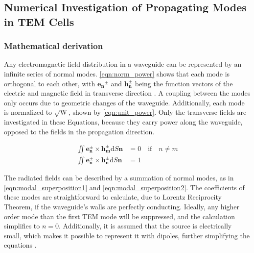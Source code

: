 \subsection{Numerical Investigation of Propagating Modes in TEM Cells}\label{sec:modes_tem_cell}
\subsubsection{Mathematical derivation}



Any electromagnetic field distribution in a waveguide can be represented by an infinite series of normal modes. \autoref{eqn:norm_power} shows that each mode is orthogonal to each other, with $\mathbf{e_n}^\pm$ and $\mathbf{h_n^\pm}$ being the function vectors of the electric and magnetic field in transverse direction \cite{Collin_2015}. A coupling between the modes only occurs due to geometric changes of the waveguide. Additionally, each mode is normalized to $\sqrt{\mathrm{W}}$, shown by \autoref{eqn:unit_power}. Only the transverse fields are investigated in these Equations, because they carry power along the waveguide, opposed to the fields in the propagation direction.

\begin{align}
    \iint \mathbf{e_n^\pm}\times \mathbf{h_m^\pm}\mathrm{d}S\mathbf{n}&=0 \quad\text{if}\quad n\neq m
    \label{eqn:norm_power}\\
    \iint \mathbf{e_n^\pm}\times \mathbf{h_n^\pm}\mathrm{d}S\mathbf{n}&=1
    \label{eqn:unit_power}
\end{align}

The radiated fields can be described by a summation of normal modes, as in \autoref{eqn:modal_superposition1} and \autoref{eqn:modal_superposition2}. The coefficients of these modes are straightforward to calculate, due to Lorentz Reciprocity Theorem, if the waveguide's walls are perfectly conducting. Ideally, any higher order mode than the first TEM mode will be suppressed, and the calculation simplifies to $n=0$. Additionally, it is assumed that the source is electrically small, which makes it possible to represent it with dipoles, further simplifying the equations \cite{Koepke_1989}. 

